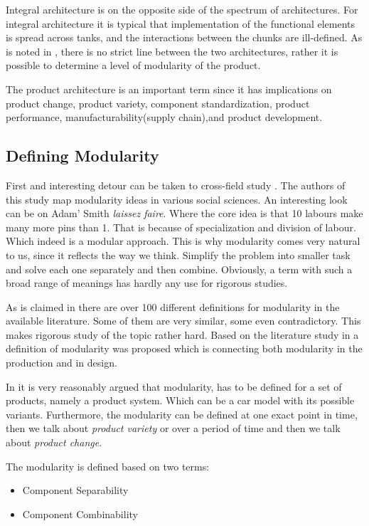 \documentclass[]{scrartcl}
\begin{document}
				
Integral architecture is on the opposite side of the spectrum of architectures. For integral architecture it is typical that implementation of the functional elements is spread across tanks, and the interactions between the chunks are ill-defined. As is noted in \cite{Ulrich2004}, there is no strict line between the two architectures, rather it is possible to determine a level of modularity of  the product. 
		
				
The product architecture  is an important term since it has implications on product change, product variety, component standardization, product performance, manufacturability(supply chain),and product development.  



\subsection{Defining Modularity}

First and interesting detour can be taken to cross-field study \cite{Li2006}. The authors of this study map modularity ideas in various social sciences. An interesting look can be on Adam' Smith \emph{laissez faire}. Where the core idea is that 10 labours make many more pins than 1. That is because of specialization and division of labour. Which indeed is a modular approach. This is why modularity comes very natural to us, since it reflects the way we think. Simplify the problem into smaller task and solve each one separately and then combine.  Obviously, a term with such a broad range of meanings has hardly any use for rigorous studies.

As is claimed in \cite{Salvador2007} there are over 100 different definitions for modularity in the available literature. Some of them are very similar, some even contradictory. This makes rigorous study of the topic rather hard.  Based on the literature study in \cite{Salvador2007} a definition of modularity was proposed which is connecting both modularity in the production and in design.  

In \cite{Salvador2007} it is very reasonably argued that modularity, has to be defined for a set of products, namely a product system. Which can be a car model with its possible variants.  Furthermore, the modularity can be defined at one exact point in time, then we talk about \emph{product variety} or over a period of time and then we talk about \emph{product change}.

The modularity is defined based on two terms:
\begin{itemize}
	\item Component Separability
	\item Component Combinability
\end{itemize}
\end{document}
